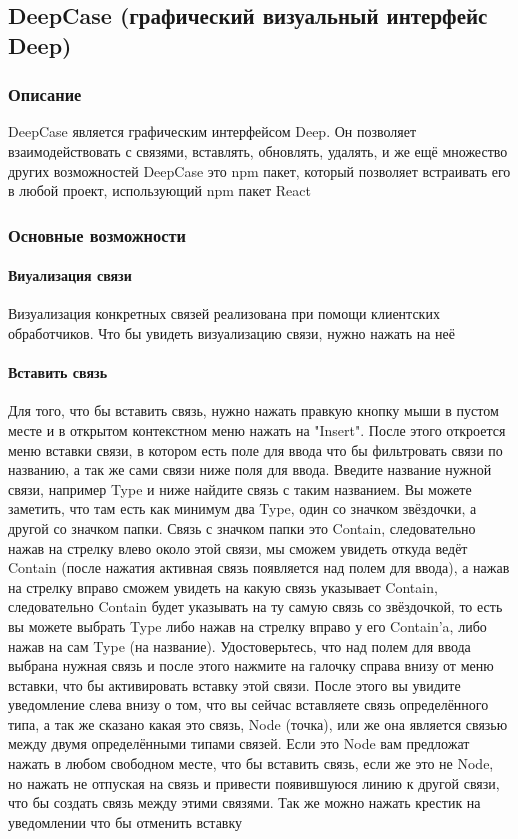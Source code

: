 \documentclass{article}
\begin{document}
\subsection{DeepCase (графический визуальный интерфейс Deep)}
\subsubsection{Описание}
DeepCase является графическим интерфейсом Deep. Он позволяет 
взаимодействовать с связями, вставлять, обновлять, удалять, и же ещё множество
других возможностей
DeepCase это npm пакет, который позволяет встраивать его в любой проект, использующий npm пакет React
\subsubsection{Основные возможности}
\paragraph{Виуализация связи}
Визуализация конкретных связей реализована при помощи клиентских обработчиков. Что бы увидеть визуализацию связи, нужно нажать на неё
\paragraph{Вставить связь}
Для того, что бы вставить связь, нужно нажать правкую кнопку мыши в пустом
месте и в открытом контекстном меню нажать на "Insert". После этого откроется
меню вставки связи, в котором есть поле для ввода что бы фильтровать связи по
названию, а так же сами связи ниже поля для ввода. Введите название нужной
связи, например Type и ниже найдите связь с таким названием. Вы можете
заметить, что там есть как минимум два Type, один со значком звёздочки, а
другой со значком папки. Связь с значком папки это Contain, следовательно нажав
на стрелку влево около этой связи, мы сможем увидеть откуда ведёт Contain
(после нажатия активная связь появляется над полем для ввода), а нажав на
стрелку вправо сможем увидеть на какую связь указывает Contain, следовательно
Contain будет указывать на ту самую связь со звёздочкой, то есть вы можете
выбрать Type либо нажав на стрелку вправо у его Contain'a, либо нажав на сам
Type (на название). Удостоверьтесь, что над полем для ввода выбрана нужная
связь и после этого нажмите на галочку справа внизу от меню вставки, что бы
активировать вставку этой связи. После этого вы увидите уведомление слева внизу
о том, что вы сейчас вставляете связь определённого типа, а так же сказано
какая это связь, Node (точка), или же она является связью между двумя
определёнными типами связей. Если это Node вам предложат нажать в любом
свободном месте, что бы вставить связь, если же это не Node, но нажать не
отпуская на связь и привести появившуюся линию к другой связи, что бы создать
связь между этими связями. Так же можно нажать крестик на уведомлении что бы
отменить вставку
\end{document}

